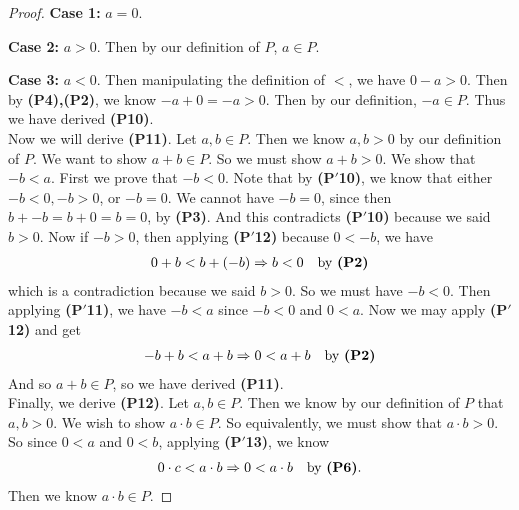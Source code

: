 \documentclass[12pt]{amsbook}
\theoremstyle{plain}
\numberwithin{section}{chapter}
\numberwithin{equation}{chapter}
\theoremstyle{definition}
\theoremstyle{remark}
\theoremstyle{plain}
\newcommand{\bee}{\begin{equation}\begin{aligned}}
\newcommand{\eee}{\end{aligned}\end{equation}}
\begin{document}
\begin{enumerate}[label=\roman*)]
\begin{proof}
\textbf{Case 1:} $a = 0$. 

\textbf{Case 2:} $a > 0$. Then by our definition of $P$, $a \in P$. 

\textbf{Case 3:} $a < 0$. Then manipulating the definition of $<$, we have $0 - a > 0$. Then by \textbf{(P4),(P2)}, we know $-a + 0 = -a > 0$. Then by our definition, $-a \in P$. 
Thus we have derived \textbf{(P10)}. \\

Now we will derive \textbf{(P11)}. Let $a,b \in P$. Then we know $a,b > 0$ by our definition of $P$. We want to show $a + b \in P$. So we must show $a + b > 0$. We show that $-b < a$. First we prove that $-b < 0$. Note that by \textbf{(P$'$10)}, we know that either $-b < 0,-b > 0$, or $-b = 0$. We cannot have $-b = 0$, since then $b + -b = b + 0 = b = 0$, by \textbf{(P3)}. And this contradicts \textbf{(P$'$10)} because we said $b > 0$. Now if $-b > 0$, then applying \textbf{(P$'$12)} because $0 < -b$, we have
\bee
0 + b < b + (-b) \Rightarrow b < 0 && \text{by \textbf{(P2)}}
\eee
which is a contradiction because we said $b > 0$. So we must have $-b < 0$. Then applying \textbf{(P$'$11)}, we have $-b < a$ since $-b < 0$ and $0 < a$. Now we may apply \textbf{(P$'$12)} and get
\bee
-b + b < a + b \Rightarrow 0 < a + b && \text{by \textbf{(P2)}}
\eee
And so $a + b \in P$, so we have derived \textbf{(P11)}. \\

Finally, we derive \textbf{(P12)}. Let $a,b \in P$. Then we know by our definition of $P$ that $a,b > 0$. We wish to show $a\cdot b \in P$. So equivalently, we must show that $a \cdot b > 0$. So since $0 < a$ and $0 < b$, applying \textbf{(P$'$13)}, we know
\bee
0 \cdot c < a \cdot b \Rightarrow 0 < a \cdot b && \text{by \textbf{(P6)}}. 
\eee
Then we know $a \cdot b \in P$. 
\end{proof}



\end{enumerate}
\end{document}
